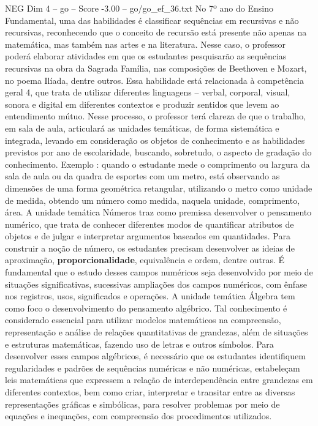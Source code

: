 \begin{textsample}{NEG Dim 4 – go – Score -3.00 – go/go\_ef\_36.txt}  \label{ex:f4_neg_223}
No 7º ano do Ensino Fundamental, uma das habilidades é classificar sequências em recursivas e não recursivas, reconhecendo que o conceito de recursão está presente não apenas na matemática, mas também nas artes e na literatura.
Nesse caso, o professor poderá elaborar atividades em que os estudantes pesquisarão as sequências recursivas na obra da Sagrada Família, nas composições de Beethoven e Mozart, no poema Ilíada, dentre outros.
Essa habilidade está relacionada à competência geral 4, que trata de utilizar diferentes linguagens – verbal, corporal, visual, sonora e digital em diferentes contextos e produzir sentidos que levem ao entendimento mútuo.
Nesse processo, o professor terá clareza de que o trabalho, em sala de aula, articulará as unidades temáticas, de forma sistemática e integrada, levando em consideração os objetos de conhecimento e as habilidades previstos por ano de escolaridade, buscando, sobretudo, o aspecto de gradação do conhecimento.
Exemplo : quando o estudante mede o comprimento ou largura da sala de aula ou da quadra de esportes com um metro, está observando as dimensões de uma forma geométrica retangular, utilizando o metro como unidade de medida, obtendo um número como medida, naquela unidade, comprimento, área.
A unidade temática Números traz como premissa desenvolver o pensamento numérico, que trata de conhecer diferentes modos de quantificar atributos de objetos e de julgar e interpretar argumentos baseados em quantidades.
Para construir a noção de número, os estudantes precisam desenvolver as ideias de aproximação, \textbf{proporcionalidade}, equivalência e ordem, dentre outras.
É fundamental que o estudo desses campos numéricos seja desenvolvido por meio de situações significativas, sucessivas ampliações dos campos numéricos, com ênfase nos registros, usos, significados e operações.
A unidade temática Álgebra tem como foco o desenvolvimento do pensamento algébrico.
Tal conhecimento é considerado essencial para utilizar modelos matemáticos na compreensão, representação e análise de relações quantitativas de grandezas, além de situações e estruturas matemáticas, fazendo uso de letras e outros símbolos.
Para desenvolver esses campos algébricos, é necessário que os estudantes identifiquem regularidades e padrões de sequências numéricas e não numéricas, estabeleçam leis matemáticas que expressem a relação de interdependência entre grandezas em diferentes contextos, bem como criar, interpretar e transitar entre as diversas representações gráficas e simbólicas, para resolver problemas por meio de equações e inequações, com compreensão dos procedimentos utilizados.

\end{textsample}
